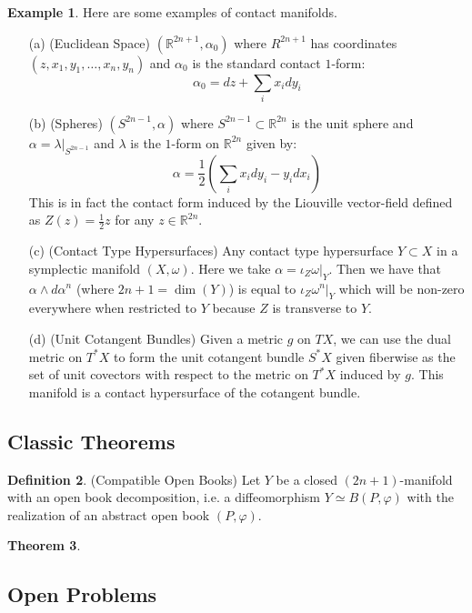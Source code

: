 \documentclass[12pt]{article}
\theoremstyle{definition}
\newtheorem{theorem}{Theorem}[section]
\newtheorem{definition}[theorem]{Definition}
\newtheorem{example}[theorem]{Example}
\numberwithin{equation}{section}
\newcommand{\R}{{\mathbb R}}
\newcommand{\op}{\operatorname}
\begin{document}
\begin{example} Here are some examples of contact manifolds.
\begin{enumerate}
	\item[(a)] (Euclidean Space) $(\R^{2n+1},\alpha_0)$ where $R^{2n+1}$ has coordinates $(z,x_1,y_1,\dots,x_n,y_n)$ and $\alpha_0$ is the standard contact $1$-form:
	\[
	\alpha_0 = dz + \sum_i x_i dy_i
	\]
	\item[(b)] (Spheres) $(S^{2n-1},\alpha)$ where $S^{2n-1} \subset \R^{2n}$ is the unit sphere and $\alpha = \lambda|_{S^{2n-1}}$ and $\lambda$ is the $1$-form on $\R^{2n}$ given by:
	\[
	\alpha = \frac{1}{2}(\sum_i x_i dy_i - y_i dx_i)
	\]
	This is in fact the contact form induced by the Liouville vector-field defined as $Z(z) = \frac{1}{2}z$ for any $z \in \R^{2n}$.
	\item[(c)] (Contact Type Hypersurfaces) Any contact type hypersurface $Y \subset X$ in a symplectic manifold $(X,\omega)$. Here we take $\alpha = \iota_Z\omega|_Y$. Then we have that $\alpha \wedge d\alpha^n$ (where $2n+1 = \op{dim}(Y)$) is equal to $\iota_Z\omega^n|_Y$ which will be non-zero everywhere when restricted to $Y$ because $Z$ is transverse to $Y$.
	\item[(d)] (Unit Cotangent Bundles) Given a metric $g$ on $TX$, we can use the dual metric on $T^*X$ to form the unit cotangent bundle $S^*X$ given fiberwise as the set of unit covectors with respect to the metric on $T^*X$ induced by $g$. This manifold is a contact hypersurface of the cotangent bundle. 
\end{enumerate}
\end{example}

\subsection{Classic Theorems} 

\begin{definition} (Compatible Open Books) Let $Y$ be a closed $(2n+1)$-manifold with an open book decomposition, i.e. a diffeomorphism $Y \simeq B(P,\varphi)$ with the realization of an abstract open book $(P,\varphi)$. 
\end{definition}

\begin{theorem} 
\end{theorem}

\subsection{Open Problems} 
\end{document}
